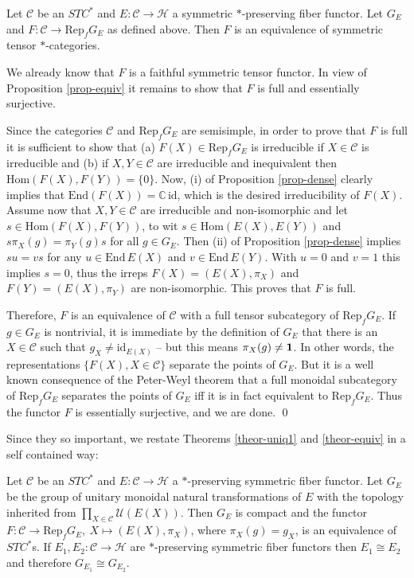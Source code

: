 \documentclass[12pt]{article}
\theoremstyle{definition}
\theoremstyle{definition}
\theoremstyle{remark}
\def\2#1{{\mathcal #1}}
\def\7#1{{\mathbb #1}}
\def\1#1{{\bf #1}}
\newcommand{\Hom}{\mathrm{Hom}}
\newcommand{\End}{\mathrm{End}}
\newcommand{\Rep}{\mathrm{Rep}}
\newcommand{\rarr}{\rightarrow}
\def\id{\mathrm{id}}
\begin{document}
\btheor \label{theor-equiv}
Let $\2C$ be an $STC^*$ and $E:\2C\rarr\2H$ a symmetric $*$-preserving fiber functor. Let $G_E$ and 
$F:\2C\rarr\Rep_fG_E$ as defined above. Then $F$ is an equivalence of symmetric tensor
$*$-categories. 
\etheor

\prf We already know that $F$ is a faithful symmetric tensor functor. In view of Proposition
\ref{prop-equiv} it remains to show that $F$ is full and essentially surjective. 

Since the categories $\2C$ and $\Rep_fG_E$ are semisimple, in order to prove that $F$ is full it is
sufficient to show that (a) $F(X)\in\Rep_fG_E$ is irreducible if $X\in\2C$ is irreducible and (b)
if $X,Y\in\2C$ are irreducible and inequivalent then $\Hom(F(X),F(Y))=\{0\}$. Now, (i) of
Proposition \ref{prop-dense} clearly implies that $\End(F(X))=\7C\,\id$, which is the desired
irreducibility of $F(X)$. Assume now that $X,Y\in\2C$ are irreducible and non-isomorphic and let 
$s\in\Hom(F(X),F(Y))$, to wit $s\in\Hom(E(X),E(Y))$ and $s\pi_X(g)=\pi_Y(g)s$ for all $g\in G_E$. 
Then (ii) of Proposition \ref{prop-dense} implies $su=vs$ for any $u\in\End\,E(X)$ and
$v\in\End\,E(Y)$. With $u=0$ and $v=1$ this implies $s=0$, thus the irreps $F(X)=(E(X),\pi_X)$ and
$F(Y)=(E(X),\pi_Y)$ are non-isomorphic. This proves that $F$ is full.

Therefore, $F$ is an equivalence of $\2C$ with a full tensor subcategory of $\Rep_fG_E$. If 
$g\in G_E$ is nontrivial, it is immediate by the definition of $G_E$ that there is an $X\in\2C$ such
that $g_X\ne\id_{E(X)}$ -- but this means $\pi_X(g)\ne\11$. In other words, the representations 
$\{F(X), X\in\2C\}$ separate the points of $G_E$. But it is a well known consequence of the
Peter-Weyl theorem that a full monoidal subcategory of $\Rep_fG_E$ separates the points of $G_E$ iff
it is in fact equivalent to $\Rep_fG_E$. Thus the functor $F$ is essentially surjective, and we are
done. 
\qed

Since they so important, we restate Theorems \ref{theor-uniq1} and \ref{theor-equiv} in a self
contained way:

\btheor \label{theor-T2} 
Let $\2C$ be an $STC^*$ and $E: \2C\rarr\2H$ a $*$-preserving symmetric fiber functor. Let $G_E$ be 
the group of unitary monoidal natural transformations of $E$ with the topology inherited from 
$\prod_{X\in\2C}\2U(E(X))$. Then $G_E$ is compact and the functor 
$F: \2C\rarr\Rep_fG_E,\ X\mapsto(E(X),\pi_X)$, where $\pi_X(g)=g_X$, is an equivalence of $STC^*$s. 
If $E_1,E_2: \2C\rarr\2H$ are $*$-preserving symmetric fiber functors then $E_1\cong E_2$ and
therefore $G_{E_1}\cong G_{E_2}$.
\etheor
\end{document}
